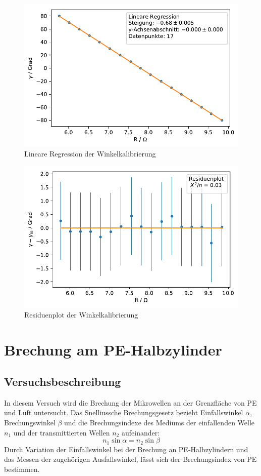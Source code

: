 \documentclass[12pt,a4paper]{article}
\begin{document}
\begin{figure}
\centering
\includegraphics[scale=1]{Bilder/Winkelkal_LinReg.pdf}
\caption{Lineare Regression der Winkelkalibrierung}
\label{Winkelkal_LinReg}
\end{figure}
\begin{figure}
\centering
\includegraphics[scale=1]{Bilder/Winkelkal_Residuen.pdf}
\caption{Residuenplot der Winkelkalibrierung}
\label{Winkelkal_Residuenplot}
\end{figure}
\newpage
\vphantom{v}
\newpage

\section{Brechung am PE-Halbzylinder}

\subsection{Versuchsbeschreibung}
In diesem Versuch wird die Brechung der Mikrowellen an der Grenzfläche von PE und Luft untersucht. Das Snelliussche Brechungsgesetz bezieht Einfallswinkel $\alpha$, Brechungswinkel $\beta$ und die Brechungsindexe des Mediums der einfallenden Welle $n_1$ und der transmittierten Wellen $n_2$ aufeinander:
\begin{equation}
n_1\sin{\alpha}=n_2\sin{\beta}
\end{equation}
Durch Variation der Einfallswinkel bei der Brechung an PE-Halbzylindern und das Messen der zugehörigen Ausfallswinkel, lässt sich der Brechungsindex von PE bestimmen. 
\end{document}
